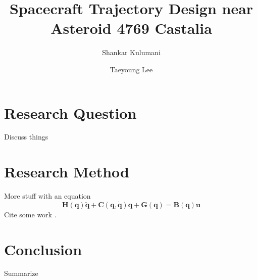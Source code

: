\documentclass[11pt,reqno]{amsart} %
\title{Spacecraft Trajectory Design near Asteroid 4769 Castalia}
\author{Shankar Kulumani}
\author{Taeyoung Lee}
\date{} %
\begin{document}
\maketitle
\begin{multicols}{2}
\section{Research Question}
Discuss things
\section{Research Method}
More stuff with an equation
\begin{equation}
	\bm{H(q) \ddot{q} + C(q,\dot{q}) \dot{q} + G(q) = B(q) u}
	\label{eq:std_dyn}
\end{equation}
Cite some work \cite{marsden2001}.
\section{Conclusion}
Summarize

%


\end{multicols}
\end{document}
